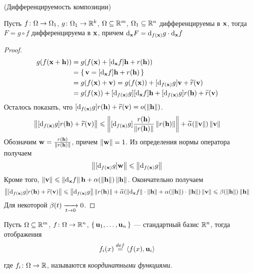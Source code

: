 \begin{theorem}(Дифференцируемость композиции)

    Пусть $f \colon \O \to \O_{1}$, $g \colon \O_{1} \to \Rk$, $\O \subseteq
    \Rm$, $\O_{1} \subseteq \Rn$ дифференцируемы в $\x$, тогда $F = g \circ f$
    дифференцируема в $\x$, причем $\der{F}{\x} = \der{g}{f(\x)} \cdot
    \der{f}{\x}$
\end{theorem}
\begin{proof}
    \begin{align*}
        g(f(\x + \h)) &= g(f(\x) + [\der{f}{\x}]\h + r(\h)) \\
        &= \{\, \v = [\der{f}{\x}]\h + r(\h) \,\} \\
        &= g(f(\x) + \v) = g(f(\x)) + [\der{g}{f(\x)}]\v + \widetilde{r}(\v) \\
        &= g(f(\x)) + [\der{g}{f(\x)}][\der{f}{\x}]\h + [\der{g}{f(\x)}]r(\h) +
        \widetilde{r}(\v) \\
    \end{align*}
    Осталось показать, что $[\der{g}{f(\x)}]r(\h) + \widetilde{r}(\v) =
    o(\norm{\h})$.
\[
    \norm{[\der{g}{f(\x)}]r(\h) + \widetilde{r}(\v)} \leqslant
    \norm{[\der{g}{f(\x)}]\frac{r(\h)}{\norm{r(\h)}}\norm{r(\h)}} +
    \widetilde{\a}(\norm{\v})\norm{\v}
\]
    Обозначим $\w = \frac{r(\h)}{\norm{r(\h)}}$, причем $\norm{\w} = 1$.
    Из определения нормы оператора получаем
\[
    \norm{[\der{g}{f(\x)}]\w} \leqslant \norm{\der{g}{f(\x)}}
\]
    Кроме того, $\norm{\v} \leqslant \norm{\der{f}{\x}}\h +
    \a(\norm{\h})\norm{\h}$. Окончательно получаем
\[
    \norm{[\der{g}{f(\x)}]r(\h) + \widetilde{r}(\v)} \leqslant
    \norm{\der{g}{f(\x)}}\norm{r(\h)} + \widetilde{\a}(\norm{\der{f}{\x}} \cdot
    \norm{\h} + \a(\norm{\h}) \cdot \norm{\h})\norm{\v} \leqslant
    \b(\norm{\h})\norm{\h}
\]
    Для некоторой $\b(t) \xrightarrow[t \to 0]{} 0$.
\end{proof}

\begin{definition}
    Пусть $\O \subseteq \Rm$, $f \colon \O \to \Rn$, $\{\, \elemvec{u}_1, \ldots,
    \elemvec{u}_n \,\}$ --- стандартный базис $\Rn$, тогда отображения
\[
    f_i(x) \defeq \langle f(x), \elemvec{u}_i \rangle
\]
    где $f_i \colon \O \to \R$, называются \textit{координатными функциями}.
\end{definition}

